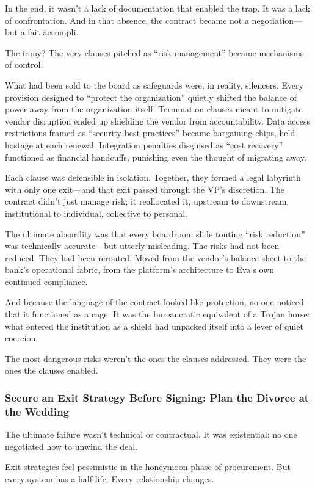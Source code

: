 In the end, it wasn’t a lack of documentation that enabled the trap. It was a lack of confrontation. And in that absence, the contract became not a negotiation—but a fait accompli.

The irony? The very clauses pitched as “risk management” became mechanisms of control.

What had been sold to the board as safeguards were, in reality, silencers. Every provision designed to “protect the organization” quietly shifted the balance of power away from the organization itself. Termination clauses meant to mitigate vendor disruption ended up shielding the vendor from accountability. Data access restrictions framed as “security best practices” became bargaining chips, held hostage at each renewal. Integration penalties disguised as “cost recovery” functioned as financial handcuffs, punishing even the thought of migrating away.

Each clause was defensible in isolation. Together, they formed a legal labyrinth with only one exit—and that exit passed through the VP’s discretion. The contract didn’t just manage risk; it reallocated it, upstream to downstream, institutional to individual, collective to personal.

The ultimate absurdity was that every boardroom slide touting “risk reduction” was technically accurate—but utterly misleading. The risks had not been reduced. They had been rerouted. Moved from the vendor’s balance sheet to the bank’s operational fabric, from the platform’s architecture to Eva’s own continued compliance.

And because the language of the contract looked like protection, no one noticed that it functioned as a cage. It was the bureaucratic equivalent of a Trojan horse: what entered the institution as a shield had unpacked itself into a lever of quiet coercion.

The most dangerous risks weren’t the ones the clauses addressed. They were the ones the clauses enabled.

\subsubsection{Secure an Exit Strategy Before Signing: Plan the Divorce at the Wedding}

The ultimate failure wasn’t technical or contractual. It was existential: no one negotiated how to unwind the deal.  

Exit strategies feel pessimistic in the honeymoon phase of procurement. But every system has a half-life. Every relationship changes.  

